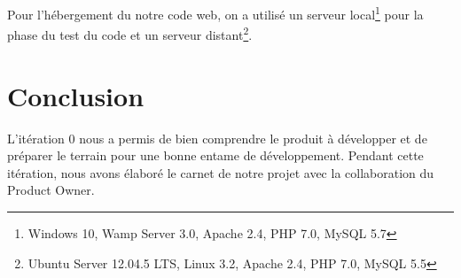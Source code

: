 Pour l'hébergement du notre code web, on a utilisé un serveur
local\footnote{Windows 10, Wamp Server 3.0, Apache 2.4, PHP 7.0, MySQL 5.7}
pour la phase du test du code et un serveur distant\footnote{Ubuntu Server
12.04.5 LTS, Linux 3.2, Apache 2.4, PHP 7.0, MySQL 5.5}.

\section*{Conclusion}

L'itération 0 nous a permis de bien comprendre le produit à développer et de
préparer le terrain pour une bonne entame de développement. Pendant cette
itération, nous avons élaboré le carnet de notre projet avec la collaboration
du Product Owner.
